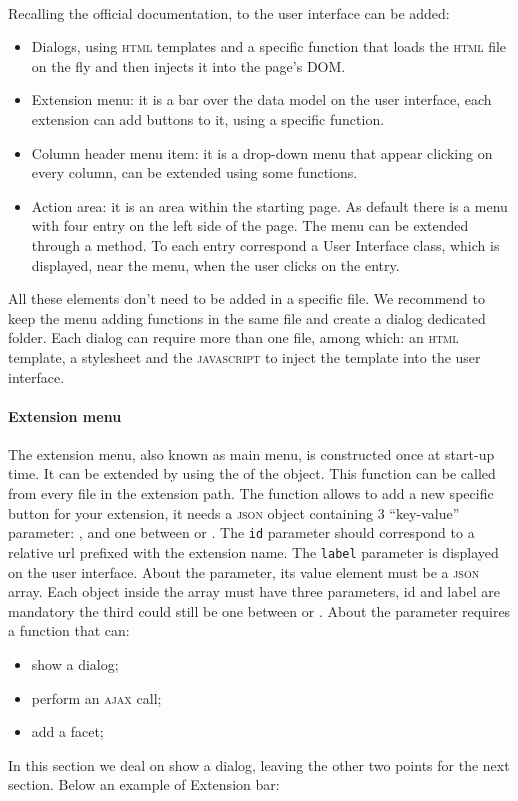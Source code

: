 \paragraph{} Recalling the official documentation, to the user interface can be added: 
\begin{itemize}
	\item \textsf{Dialogs}, using \textsc{html} templates and a specific function that loads the \textsc{html} file on the fly and then injects it into the page's DOM.
	\item \textsf{Extension menu}: it is a bar over the data model on the user interface, each extension can add buttons to it, using a specific function.
	\item \textsf{Column header menu item}: it is a drop-down menu that appear clicking on every column, can be extended using some functions.
	\item \textsf{Action area}: it is an area within the starting page. As default there is a menu with four entry on the left side of the page. The menu can be extended through a method. To each entry correspond a User Interface class, which is displayed, near the menu, when the user clicks on the entry.
\end{itemize} 
All these elements don't need to be added in a specific file. We recommend to keep the menu adding functions in the same file and create a dialog dedicated folder. Each dialog can require more than one file, among which: an \textsc{html} template, a stylesheet and the \textsc{javascript} to inject the template into the user interface.

\paragraph{Extension menu} The extension menu, also known as main menu, is constructed once at start-up time. It can be extended by using the  of the  object. This function can be called from every file in the extension path. The  function allows to add a new specific button for your extension, it needs a \textsc{json} object containing 3 ``key-value'' parameter: ,  and one between  or . The \texttt{id} parameter should correspond to a relative url prefixed with the extension name. The \texttt{label} parameter is displayed on the user interface. About the  parameter, its value element must be a \textsc{json} array. Each object inside the array must have three parameters, id and label are mandatory the third could still be one between  or . About the  parameter requires a function that can: 
\begin{itemize}
	\item show a dialog;
	\item perform an \textsc{ajax} call;
	\item add a facet;
\end{itemize}
In this section we deal on show a dialog, leaving the other two points for the next section. Below an example of Extension bar:

